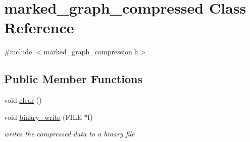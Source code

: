 \hypertarget{classmarked__graph__compressed}{}\section{marked\+\_\+graph\+\_\+compressed Class Reference}
\label{classmarked__graph__compressed}


{\ttfamily \#include $<$marked\+\_\+graph\+\_\+compression.\+h$>$}

\subsection*{Public Member Functions}
\begin{DoxyCompactItemize}
\item 
void \hyperlink{classmarked__graph__compressed_af58307bfadcaa4c3ca6dd594c2f9b3a9}{clear} ()
\item 
void \hyperlink{classmarked__graph__compressed_ab9cdb7fc43badd58fb5202f74ffac723}{binary\+\_\+write} (F\+I\+LE $\ast$f)
\begin{DoxyCompactList}\small\item\em writes the compressed data to a binary file \end{DoxyCompactList}\end{DoxyCompactItemize}
